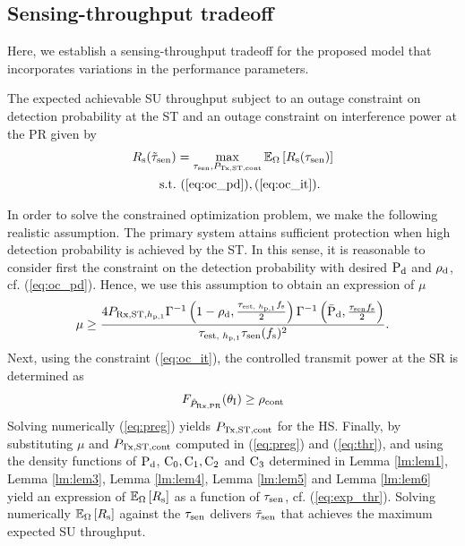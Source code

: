 \subsection*{Sensing-throughput tradeoff}
Here, we establish a sensing-throughput tradeoff for the proposed model that incorporates variations in the performance parameters. 
\begin{theorem} \label{th:th1}
\normalfont
The expected achievable SU throughput subject to an outage constraint on detection probability at the ST and an outage constraint on interference power at the PR given by
\begin{align}
R_{\text{s}}(\tilde{\tau}_{\text{sen}}) &= \operatorname*{max}_{\tau_{\text{sen}}, P_{\text{Tx,ST,cont}}} {\mathbb E}_{\Omega}\left[ R_{\text{s}}(\tau_{\text{sen}}) \right] \label{eq:opT_em}\\
\text{s.t.} & \text{ } (\ref{eq:oc_pd}), (\ref{eq:oc_it}). \nonumber 
\end{align}
\end{theorem}
\begin{IEEEproof}
In order to solve the constrained optimization problem, we make the following realistic assumption. The primary system attains sufficient protection when high detection probability is achieved by the ST. In this sense, it is reasonable to consider first the constraint on the detection probability with desired $\text{P}_{\text{d}}$ and $\rho_{\text{d}}$, cf. (\ref{eq:oc_pd}). Hence, we use this assumption to obtain an expression of $\mu$ \cite{Kaushik16}
\begin{align}
\mu \ge \frac{4 P_{\text{Rx,ST,$h_{\text{p,1}}$}} \Gamma^{-1} \left(1 - \rho_{\text{d}}, \frac{\tau_{\text{est, $h_{\text{p,1}}$}} f_{\text{s}}}{2}\right) \Gamma^{-1} \left(\bar{\text{P}}_{\text{d}}, \frac{\tau_{\text{sen}} f_{\text{s}}}{2}\right)}{ \tau_{\text{est, $h_{\text{p,1}}$}} \tau_{\text{sen}} (f_{\text{s}})^2  }. 
\label{eq:thr}
\end{align}
Next, using the constraint (\ref{eq:oc_it}), the controlled transmit power at the SR is determined as  
\begin{align}
\fprcvdpr(\ite) \ge \opc %
\label{eq:preg}
\end{align}
Solving numerically (\ref{eq:preg}) yields $P_{\text{Tx,ST,cont}}$ for the HS.
Finally, by substituting $\mu$ and $P_{\text{Tx,ST,cont}}$ computed in (\ref{eq:preg}) and (\ref{eq:thr}), and using the density functions of $\text{P}_{\text{d}}$, $\text{C}_{\text{0}}, \text{C}_{\text{1}}, \text{C}_{\text{2}}$ and $\text{C}_{\text{3}}$ determined in Lemma \ref{lm:lem1}, Lemma \ref{lm:lem3}, Lemma \ref{lm:lem4}, Lemma \ref{lm:lem5} and Lemma \ref{lm:lem6} yield an expression of ${\mathbb E}_{\Omega}\left[ R_{\text{s}} \right]$ as a function of $\tau_{\text{sen}}$, cf. (\ref{eq:exp_thr}). Solving numerically ${\mathbb E}_{\Omega}\left[ R_{\text{s}} \right]$ against the $\tau_{\text{sen}}$ delivers $\tilde{\tau}_{\text{sen}}$ that achieves the maximum expected SU throughput.  
\end{IEEEproof}
